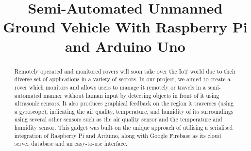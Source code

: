 \documentclass[conference,a4paper]{IEEEtran}
\begin{document}
\title{Semi-Automated Unmanned Ground Vehicle With Raspberry Pi and Arduino Uno }

\makeatletter
\newcommand{\linebreakand}{%
  \end{@IEEEauthorhalign}
  \hfill\mbox{}\par
  \mbox{}\hfill\begin{@IEEEauthorhalign}
}
\makeatother

\author{
  \and
  \and
  \and
}

\maketitle

\begin{abstract}
Remotely operated and monitored rovers will soon take over the IoT world due to their diverse set of applications in a variety of sectors. In our project, we aimed to create a rover which monitors and allows users to manage it remotely or travels in a semi-automated manner without human input by detecting objects in front of it using ultrasonic sensors. It also produces graphical feedback on the region it traverses (using a gyroscope), indicating the air quality, temperature, and humidity of its surroundings using several other sensors such as the air quality sensor and the temperature and humidity sensor. This gadget was built on the unique approach of utilising a serialised integration of Raspberry Pi and Arduino, along with Google Firebase as its cloud server database and an easy-to-use interface.
\end{abstract}
\end{document}

